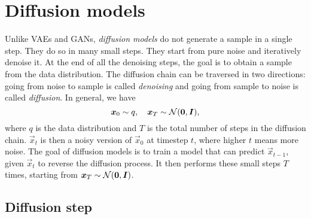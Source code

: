 \section{Diffusion models}

Unlike VAEs and GANs, \textit{diffusion models} do not generate a sample in a single step. They do
so in many small steps. They start from pure noise and iteratively denoise it. At the end of all
the denoising steps, the goal is to obtain a sample from the data distribution. The diffusion chain
can be traversed in two directions: going from noise to sample is called \textit{denoising} and
going from sample to noise is called \textit{diffusion}. In general, we have \[
    \bm{x}_0 \sim q, \quad \bm{x}_T \sim \mathcal{N}(\bm{0},\bm{I}),
\]
where $q$ is the data distribution and $T$ is the total number of steps in the diffusion chain.
$\vec{x}_t$ is then a noisy version of $\vec{x}_0$ at timestep $t$, where higher $t$ means more
noise. The goal of diffusion models is to train a model that can predict $\vec{x}_{t-1}$, given
$\vec{x}_t$ to reverse the diffusion process. It then performs these small steps $T$ times,
starting from $\bm{x}_T \sim \mathcal{N}(\bm{0},\bm{I})$.

\subsection{Diffusion step}

